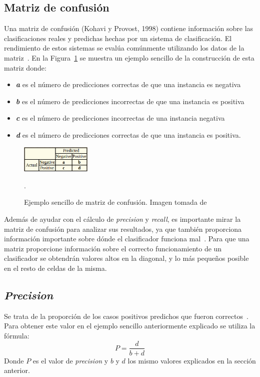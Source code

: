 \subsection{Matriz de confusión}
Una matriz de confusión (Kohavi y Provost, 1998) contiene información sobre las clasificaciones reales y predichas hechas por un sistema de clasificación. El rendimiento de estos sistemas se evalúa comúnmente utilizando los datos de la matriz~\cite{metrics}. En la Figura~\ref{fig.matriz} se muestra un ejemplo sencillo de la construcción de esta matriz donde:
\begin{itemize}
	\item \textbf{\textit{a}} es el número de predicciones correctas de que una instancia es negativa
	\item \textbf{\textit{b}} es el número de predicciones incorrectas de que una instancia es positiva
	\item \textbf{\textit{c}} es el número de predicciones incorrectas de una instancia negativa
	\item \textbf{\textit{d}} es el número de predicciones correctas de que una instancia es positiva.
\end{itemize}

\begin{figure}[H]
	\begin{center}
		\includegraphics[width=0.3\textwidth]{figures/matrizexample}
		\caption{Ejemplo sencillo de matriz de confusión. Imagen tomada de~\cite{metrics}}.
		\label{fig.matriz}
	\end{center}
\end{figure}

Además de ayudar con el cálculo de \textit{precision} y \textit{recall}, es importante mirar la matriz de confusión para analizar sus resultados, ya que también proporciona información importante sobre dónde el clasificador funciona mal~\cite{metrics2}. Para que una matriz proporcione información sobre el correcto funcionamiento de un clasificador se obtendrán valores altos en la diagonal, y lo más pequeños posible en el resto de celdas de la misma.

\subsection{\textit{Precision}}
Se trata de la proporción de los casos positivos predichos que fueron correctos~\cite{metrics}. Para obtener este valor en el ejemplo sencillo anteriormente explicado se utiliza la fórmula:
$$P = \frac{d}{b+d} $$
Donde $P$ es el valor de \textit{precision} y $b$ y $d$ los mismo valores explicados en la sección anterior.\\

